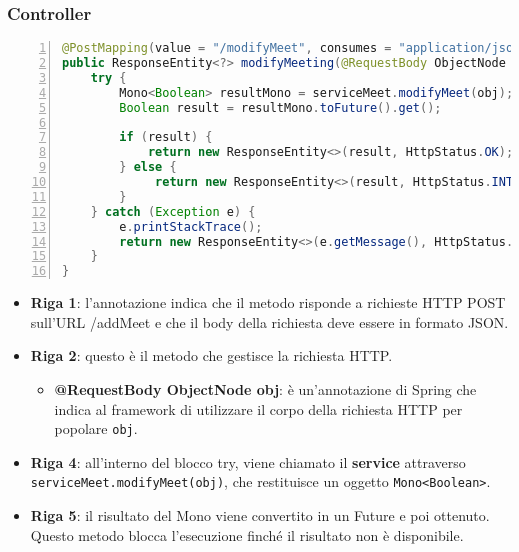 \subsubsection{Controller}
\begin{lstlisting}[language=java, frame=lines, basicstyle=\ttfamily\scriptsize, numbers=left]
@PostMapping(value = "/modifyMeet", consumes = "application/json")
public ResponseEntity<?> modifyMeeting(@RequestBody ObjectNode obj) {
    try {   
        Mono<Boolean> resultMono = serviceMeet.modifyMeet(obj); 
        Boolean result = resultMono.toFuture().get();
    
        if (result) {
            return new ResponseEntity<>(result, HttpStatus.OK);
        } else {
             return new ResponseEntity<>(result, HttpStatus.INTERNAL_SERVER_ERROR);
        }  
    } catch (Exception e) {
        e.printStackTrace();
        return new ResponseEntity<>(e.getMessage(), HttpStatus.INTERNAL_SERVER_ERROR);
    }
}
\end{lstlisting}
\begin{itemize}
    \item \textbf{Riga 1}:
    l'annotazione indica che il metodo risponde a richieste HTTP POST sull'URL /addMeet 
    e che il body della richiesta deve essere in formato JSON.
  
    \item \textbf{Riga 2}:
    questo è il metodo che gestisce la richiesta HTTP. 
        \begin{itemize}
            
            \item \textbf{@RequestBody ObjectNode obj}: è un'annotazione di Spring che indica al framework di 
            utilizzare il corpo della richiesta HTTP per popolare \texttt{obj}.
            
        \end{itemize}
  
    \item \textbf{Riga 4}:
    all'interno del blocco try, viene chiamato il \textbf{service} attraverso
    \texttt{serviceMeet.modifyMeet(obj)}, che restituisce un oggetto 
    \texttt{Mono\textless{}Boolean\textgreater{}}. 
  
    \item \textbf{Riga 5}:
    il risultato del Mono viene convertito in un Future e poi ottenuto. Questo metodo blocca l'esecuzione 
    finché il risultato non è disponibile.
\end{itemize}